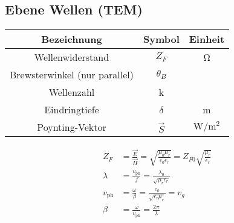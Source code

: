 \subsection*{Ebene Wellen (TEM)}
\begin{center}
\begin{tabular}{ccc} \toprule
Bezeichnung & Symbol & Einheit \\ \midrule
Wellenwiderstand & $Z_F$ & \si{\ohm} \\
Brewsterwinkel (nur parallel) & $\theta_B$ &  \\
Wellenzahl & k & \\
Eindringtiefe & $\delta$ & \si{\meter} \\
Poynting-Vektor & $\vec{S}$ & $\si{\watt\per\meter^2}$ \\
\bottomrule
\end{tabular}
\end{center}

\begin{align*}
Z_F &= \frac{\vec{E}}{\vec{H}} = \sqrt{\frac{\mu_0 \mu_r}{\epsilon_0 \epsilon_r}} = Z_{F0} \sqrt{\frac{\mu_r}{\epsilon_r}} \\
\lambda &= \frac{v_\text{ph}}{f} = \frac{\lambda_0}{\sqrt{\mu_r \epsilon_r}} \\
v_\text{ph} &= \frac{\omega}{\beta} = \frac{c_0}{\sqrt{\epsilon_r \mu_r}} = v_g \\
\beta &= \frac{\omega}{v_\text{ph}} = \frac{2 \pi}{\lambda}
\end{align*}

